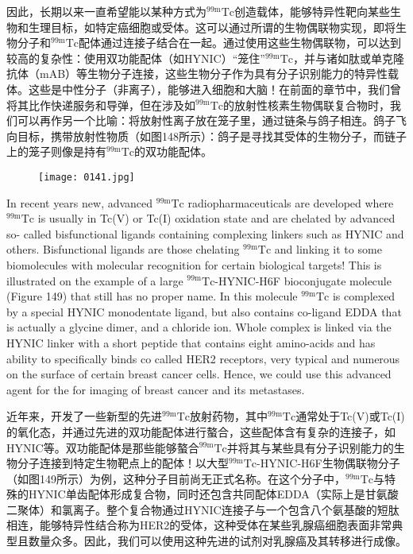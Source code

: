 \documentclass[dvipsnames, svgnames,a4paper,11pt]{article}
\begin{document}
因此，长期以来一直希望能以某种方式为${}^\mathrm{99m}\mathrm{Tc}$创造载体，能够特异性靶向某些生物和生理目标，如特定癌细胞或受体。这可以通过所谓的生物偶联物实现，即将生物分子和${}^\mathrm{99m}\mathrm{Tc}$配体通过连接子结合在一起。通过使用这些生物偶联物，可以达到较高的复杂性：使用双功能配体（如HYNIC）“笼住”${}^\mathrm{99m}\mathrm{Tc}$，并与诸如肽或单克隆抗体（mAB）等生物分子连接，这些生物分子作为具有分子识别能力的特异性载体。这些是中性分子（非离子），能够进入细胞和大脑！在前面的章节中，我们曾将其比作快递服务和导弹，但在涉及如${}^\mathrm{99m}\mathrm{Tc}$的放射性核素生物偶联复合物时，我们可以再作另一个比喻：将放射性离子放在笼子里，通过链条与鸽子相连。鸽子飞向目标，携带放射性物质（如图148所示）：鸽子是寻找其受体的生物分子，而链子上的笼子则像是持有${}^\mathrm{99m}\mathrm{Tc}$的双功能配体。

\begin{figure}[h]
	\centering
    \texttt{[image: 0141.jpg]}    
     \label{fig148}
\end{figure}

In recent years new, advanced ${}^\mathrm{99m}\mathrm{Tc}$ radiopharmaceuticals are developed where
${}^\mathrm{99m}\mathrm{Tc}$ is usually in Tc(V) or Tc(I) oxidation state and are chelated by advanced so-
called bisfunctional ligands containing complexing linkers such as HYNIC and others.
Bisfunctional ligands are those chelating ${}^\mathrm{99m}\mathrm{Tc}$ and linking it to some biomolecules
with molecular recognition for certain biological targets! This is illustrated on the
example of a large ${}^\mathrm{99m}\mathrm{Tc}$-HYNIC-H6F bioconjugate molecule (Figure 149) that still
has no proper name. In this molecule ${}^\mathrm{99m}\mathrm{Tc}$ is complexed by a special HYNIC
monodentate ligand, but also contains co-ligand EDDA that is actually a glycine
dimer, and a chloride ion. Whole complex is linked via the HYNIC linker with a short
peptide that contains eight amino-acids and has ability to specifically binds co called
HER2 receptors, very typical and numerous on the surface of certain breast cancer
cells. Hence, we could use this advanced agent for the for imaging of breast cancer
and its metastases.

近年来，开发了一些新型的先进${}^\mathrm{99m}\mathrm{Tc}$放射药物，其中${}^\mathrm{99m}\mathrm{Tc}$通常处于Tc(V)或Tc(I)的氧化态，并通过先进的双功能配体进行螯合，这些配体含有复杂的连接子，如HYNIC等。双功能配体是那些能够螯合${}^\mathrm{99m}\mathrm{Tc}$并将其与某些具有分子识别能力的生物分子连接到特定生物靶点上的配体！以大型${}^\mathrm{99m}\mathrm{Tc}$-HYNIC-H6F生物偶联物分子（如图149所示）为例，这种分子目前尚无正式名称。在这个分子中，${}^\mathrm{99m}\mathrm{Tc}$与特殊的HYNIC单齿配体形成复合物，同时还包含共同配体EDDA（实际上是甘氨酸二聚体）和氯离子。整个复合物通过HYNIC连接子与一个包含八个氨基酸的短肽相连，能够特异性结合称为HER2的受体，这种受体在某些乳腺癌细胞表面非常典型且数量众多。因此，我们可以使用这种先进的试剂对乳腺癌及其转移进行成像。
\end{document}
